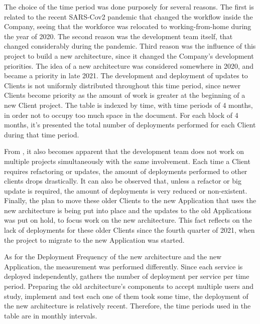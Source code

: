 The choice of the time period was done purposely for several reasons. The first is related to the recent SARS-Cov2 pandemic that changed the workflow inside the Company, seeing that the workforce was relocated to working-from-home during the year of 2020. The second reason was the development team itself, that changed considerably during the pandemic. Third reason was the influence of this project to build a new architecture, since it changed the Company's development priorities. The idea of a new architecture was considered somewhere in 2020, and became a priority in late 2021. The development and deployment of updates to Clients is not uniformly distributed throughout this time period, since newer Clients become priority as the amount of work is greater at the beginning of a new Client project. The table is indexed by time, with time periods of 4 months, in order not to occupy too much space in the document. For each block of 4 months, it's presented the total number of deployments performed for each Client during that time period. 

From , it also becomes apparent that the development team does not work on multiple projects simultaneously with the same involvement. Each time a Client requires refactoring or updates, the amount of deployments performed to other clients drops drastically. It can also be observed that, unless a refactor or big update is required, the amount of deployments is very reduced or non-existent.
Finally, the plan to move these older Clients to the new Application that uses the new architecture is being put into place and the updates to the old Applications was put on hold, to focus work on the new architecture. This fact reflects on the lack of deployments for these older Clients since the fourth quarter of 2021, when the project to migrate to the new Application was started.



As for the Deployment Frequency of the new architecture and the new Application, the measurement was performed differently. Since each service is deployed independently,  gathers the number of deployment per service per time period. Preparing the old architecture's components to accept multiple users and study, implement and test each one of them took some time, the deployment of the new architecture is relatively recent. Therefore, the time periods used in the table are in monthly intervals.

